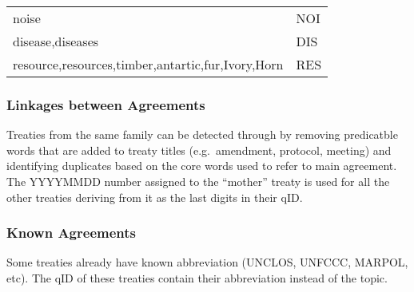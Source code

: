 \documentclass[
]{article}
\begin{document}
\begin{longtable}[]{@{}ll@{}}
\begin{minipage}[t]{0.47\columnwidth}\raggedright
noise\strut
\end{minipage} & \begin{minipage}[t]{0.47\columnwidth}\raggedright
NOI\strut
\end{minipage}\tabularnewline
\begin{minipage}[t]{0.47\columnwidth}\raggedright
disease,diseases\strut
\end{minipage} & \begin{minipage}[t]{0.47\columnwidth}\raggedright
DIS\strut
\end{minipage}\tabularnewline
\begin{minipage}[t]{0.47\columnwidth}\raggedright
resource,resources,timber,antartic,fur,Ivory,Horn\strut
\end{minipage} & \begin{minipage}[t]{0.47\columnwidth}\raggedright
RES\strut
\end{minipage}\tabularnewline
\bottomrule
\end{longtable}

\hypertarget{linkages-between-agreements}{%
\subsubsection{Linkages between
Agreements}\label{linkages-between-agreements}}

Treaties from the same family can be detected through by removing
predicatble words that are added to treaty titles (e.g.~amendment,
protocol, meeting) and identifying duplicates based on the core words
used to refer to main agreement. The YYYYMMDD number assigned to the
``mother'' treaty is used for all the other treaties deriving from it as
the last digits in their qID.

\hypertarget{known-agreements}{%
\subsubsection{Known Agreements}\label{known-agreements}}

Some treaties already have known abbreviation (UNCLOS, UNFCCC, MARPOL,
etc). The qID of these treaties contain their abbreviation instead of
the topic.
\end{document}
